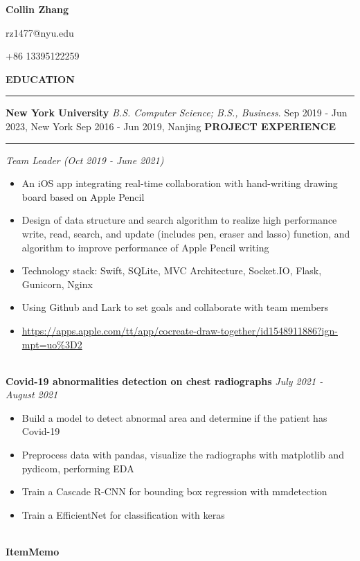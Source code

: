 \documentclass{article}
\begin{document}
\begin{center}
{\huge \textbf{Collin Zhang}}\par
rz1477@nyu.edu\par+86 13395122259
\end{center}

\noindent
{\textbf{EDUCATION}}\newline
\rule{\textwidth}{1pt}
{\textbf {New York University}}\newline
\emph {B.S. Computer Science; B.S., Business}.\newline
{Sep 2019 - Jun 2023, New York}\newline
{}\newline
{Sep 2016 - Jun 2019, Nanjing}\newline
\newline
\noindent
{\textbf{PROJECT EXPERIENCE}}\newline
\rule{\textwidth}{1pt}\newline
\emph{Team Leader (Oct 2019 - June 2021)}
\begin{itemize}[leftmargin=*,topsep=0pt]
\item An iOS app integrating real-time collaboration with hand-writing drawing board based on Apple Pencil
\item Design of data structure and search algorithm to realize high performance write, read, search, and update (includes pen, eraser and lasso) function, and algorithm to improve performance of Apple Pencil writing
\item Technology stack: Swift, SQLite, MVC Architecture, Socket.IO, Flask, Gunicorn, Nginx
\item Using Github and Lark to set goals and collaborate with team members
\item \url{https://apps.apple.com/tt/app/cocreate-draw-together/id1548911886?ign-mpt=uo%3D2}

\end{itemize} \ \\ {\textbf{Covid-19 abnormalities detection on chest radiographs}}\newline
\emph{July 2021 - August 2021}
\begin{itemize}[leftmargin=*,topsep=0pt]
\item Build a model to detect abnormal area and determine if the patient has Covid-19
\item Preprocess data with pandas, visualize the radiographs with matplotlib and pydicom, performing EDA
\item Train a Cascade R-CNN for bounding box regression with mmdetection
\item Train a EfficientNet for classification with keras

\end{itemize} \ \\ {\textbf{ItemMemo}}\newline
\end{document}
